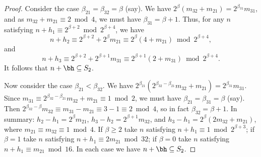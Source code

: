 \documentclass[12pt, reqno, twoside, letterpaper]{amsart}
\begin{document}
\begin{nix}
\begin{proof}
Consider the case $\beta_{21} = \beta_{32} = \beta$ (say).
%
We have   
$
  2^{\beta}(m_{32} + m_{21}) = 2^{\beta_{31}}m_{31} 
$,
and as $m_{32} + m_{21} \equiv 2 \bmod 4$, we must have 
$\beta_{31} = \beta + 1$. 
%
Thus, for any $n$ satisfying 
$n + h_1 \equiv 2^{\beta + 2} \bmod 2^{\beta + 4}$, we have  
\[
 n + h_2 \equiv 2^{\beta + 2} + 2^{\beta}m_{21}
          \equiv 2^{\beta}(4 + m_{21})
           \bmod 2^{\beta + 4},
\]
and 
\[
 n + h_3 \equiv 2^{\beta + 2} + 2^{\beta + 1}m_{31}
          \equiv 2^{\beta + 1}(2 + m_{31})
           \bmod 2^{\beta + 4}.
\]
%
It follows that $n + \bh \subseteq S_2$.

Now consider the case $\beta_{21} < \beta_{32}$.
%
We have 
$
 2^{\beta_{21}}(2^{\beta_{32} - \beta_{21}}m_{32} + m_{21}) 
  = 2^{\beta_{31}}m_{31} 
$.
%
Since 
$
 m_{31} \equiv 2^{\beta_{32} - \beta_{21}}m_{32} + m_{21} 
         \equiv 1 \bmod 2
$, 
we must have $\beta_{21} = \beta_{31} = \beta$ (say).
%
Then 
$
 2^{\beta_{32} - \beta}m_{32} 
  \equiv m_{31} - m_{21} 
   \equiv 3 - 1 
    \equiv 2 \bmod 4
$, 
so in fact $\beta_{32} = \beta + 1$.
%
In summary:  
$
 h_2 - h_1 = 2^{\beta}m_{21}
$, 
$
 h_3 - h_2 = 2^{\beta + 1}m_{32}
$,
and 
$
 h_3 - h_1 = 2^{\beta}(2m_{32} + m_{21})
$, 
where $m_{21} \equiv m_{32} \equiv 1 \bmod 4$.
%
If $\beta \ge 2$ take $n$ satisfying 
$n + h_1 \equiv 1 \bmod 2^{\beta + 3}$;
if $\beta = 1$ take $n$ satisfying 
$n + h_1 \equiv 2m_{21} \bmod 32$; 
if $\beta = 0$ take $n$ satisfying 
$n + h_1 \equiv m_{21} \bmod 16$.
%
In each case we have $n + \bh \subseteq S_2$.
\end{proof}
%
\end{nix}
\end{document}
